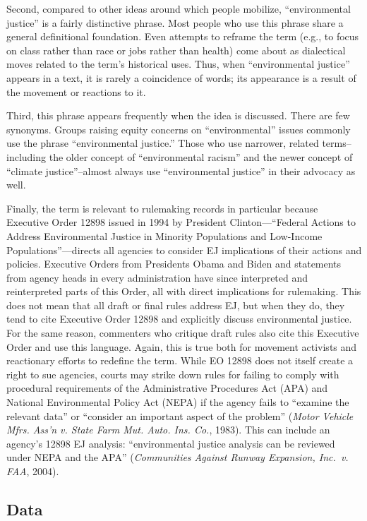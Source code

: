 \documentclass[
      12pt,
        ]{article}
\begin{document}
Second, compared to
other ideas around which people mobilize, ``environmental justice'' is a
fairly distinctive phrase. Most people who use this phrase share a
general definitional foundation. Even attempts to reframe the term (e.g., to focus on class rather than race or jobs rather than health) come about as dialectical moves related to the term's historical uses. Thus, when ``environmental justice'' appears in a text, it is rarely a coincidence of words; its appearance is a result of the movement or reactions to it.

Third, this phrase appears frequently
when the idea is discussed. There are few synonyms. Groups raising equity concerns on ``environmental'' issues commonly use the phrase ``environmental justice.'' Those who use narrower, related terms--including the older concept of
``environmental racism'' and the newer concept of ``climate justice''--almost always use ``environmental justice'' in their advocacy as well.

Finally, the term is relevant to rulemaking records in
particular because Executive Order 12898 issued in 1994 by President
Clinton---``Federal Actions to Address Environmental Justice in Minority
Populations and Low-Income Populations''---directs all agencies to consider EJ implications of their actions and policies. Executive Orders from Presidents Obama and Biden and statements from agency heads in every administration have since interpreted and reinterpreted parts of this Order, all with direct implications for rulemaking.
This does not mean that all draft or final rules address EJ, but when they
do, they tend to cite Executive Order 12898 and explicitly discuss
environmental justice. For the same reason, commenters who critique draft rules also cite this Executive Order and use this language. Again, this is true both for movement activists and reactionary efforts to redefine the term.
While EO 12898 does not itself create a right to sue agencies, courts may strike down rules for failing to comply with procedural requirements of the Administrative Procedures Act (APA) and National Environmental Policy Act (NEPA) if the agency fails to ``examine the relevant data'' or ``consider an important aspect of the problem'' (\emph{Motor Vehicle Mfrs. Ass'n v. State Farm Mut. Auto. Ins. Co.}, 1983). This can include an agency's 12898 EJ analysis: ``environmental justice analysis can be reviewed under NEPA and the APA'' (\emph{Communities Against Runway Expansion, Inc.~v. FAA}, 2004).

\hypertarget{data}{%
\subsection{Data}\label{data}}
\end{document}
